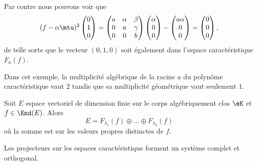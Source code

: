 \begin{remark}
    Par contre nous pouvons voir que
    \begin{equation}
        (f-\alpha\mtu)^2\begin{pmatrix}
             0   \\ 
            1    \\ 
            0    
        \end{pmatrix}=
        \begin{pmatrix}
            a    &   \alpha    &   \beta    \\
            0    &   a    &   \gamma    \\
            0    &   0    &   b
        \end{pmatrix}
        \begin{pmatrix}
            \alpha    \\ 
            0    \\ 
            0    
        \end{pmatrix}-\begin{pmatrix}
            a\alpha    \\ 
            0    \\ 
            0    
        \end{pmatrix}=\begin{pmatrix}
            0    \\ 
            0    \\ 
            0    
        \end{pmatrix},
    \end{equation}
    de telle sorte que le vecteur \( (0,1,0)\) soit également dans l'espace caractéristique \( F_a(f)\).

    Dans cet exemple, la multiplicité algébrique de la racine \( a\) du polynôme caractéristique vaut \( 2\) tandis que sa multiplicité géométrique vaut seulement \( 1\).
\end{remark}

\begin{theorem}     \label{ThoSpectraluRMLok}
    Soit \( E\) espace vectoriel de dimension finie sur le corps algébriquement clos \( \eK\) et \( f\in\End(E)\). Alors
    \begin{equation}    \label{EqCTFHooBSGhYK}
        E=F_{\lambda_1}(f)\oplus\ldots\oplus F_{\lambda_k}(f)
    \end{equation}
    où la somme est sur les valeurs propres distinctes de \( f\).

    Les projecteurs sur les espaces caractéristique forment un système complet et orthogonal.
\end{theorem}

